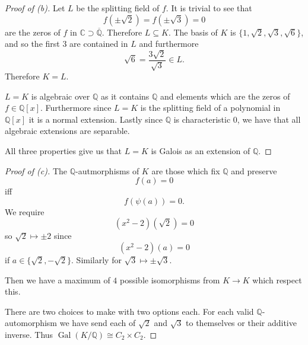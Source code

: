 \begin{proof}[Proof of (b)]
    Let $L$ be the splitting field of $f$. 
    It is trivial to see that 
    \[
        f(\pm\sqrt 2) = f(\pm\sqrt 3) = 0
    \]
    are the zeros of $f$ in $\mathbb C \supset 
    \overline{\mathbb Q}$.  
    Therefore $L \subseteq K$.
    The basis of $K$ is $\{1,\sqrt 2, \sqrt 3, \sqrt 6\}$, 
    and so the first $3$ are contained in $L$ and furthermore 
    \[
        \sqrt 6 = \frac{3\sqrt 2}{\sqrt 3} \in L.
    \]
    Therefore $K = L$. 

    $L = K$ is algebraic over $\mathbb Q$ as 
    it contains $\mathbb Q$ and elements which 
    are the zeros of $f \in \mathbb Q[x]$. 
    Furthermore since $L=K$ is the splitting field 
    of a polynomial in $\mathbb Q[x]$ it is a 
    normal extension. Lastly since 
    $\mathbb Q$ is characteristic $0$, 
    we have that all algebraic extensions are 
    separable. 

    All three properties give us that 
    $L=K$ is Galois as an extension of 
    $\mathbb Q$.
\end{proof}

\begin{proof}[Proof of (c)]
    The $\mathbb Q$-autmorphisms of $K$ are 
    those which fix $\mathbb Q$ and 
    preserve 
    \[
        f(a) = 0
    \]
    iff 
    \[
        f(\psi(a)) = 0. 
    \]
    We require 
    \[
        (x^2 - 2)(\sqrt 2) = 0
    \]
    so $\sqrt 2 \mapsto \pm 2$ since 
    \[
        (x^2 - 2)(a) = 0
    \]
    if $a \in \{\sqrt 2, -\sqrt 2\}$. 
    Similarly for $\sqrt 3 \mapsto \pm \sqrt 3$. 

    Then we have a maximum of $4$ possible 
    isomorphisms from $K \to K$ which 
    respect this. 


    There are two choices to make 
    with two options each. For each 
    valid $\mathbb Q$-automorphism we have 
    send each of $\sqrt 2$ and $\sqrt 3$ 
    to themselves or their additive inverse. 
    Thus $\operatorname{Gal}(K/\mathbb Q) \cong C_2 \times C_2$. 
\end{proof}

